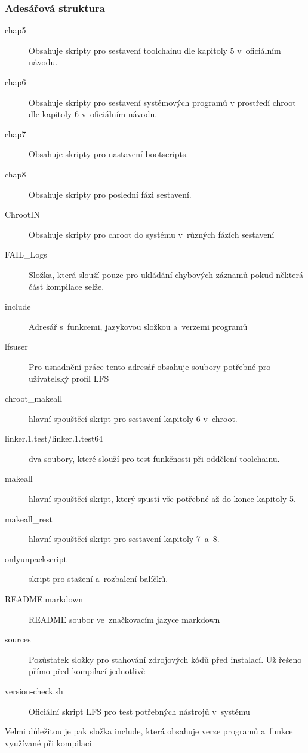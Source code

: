 \documentclass[a4paper,12pt]{article}
\begin{document}
\subsubsection{Adesářová struktura}
\begin{description}
 \item[chap5] Obsahuje skripty pro sestavení toolchainu dle kapitoly 5 v~oficiálním návodu.
 \item[chap6] Obsahuje skripty pro sestavení systémových programů v prostředí chroot dle kapitoly 6 v~oficiálním návodu.
 \item[chap7] Obsahuje skripty pro nastavení bootscripts.
 \item[chap8] Obsahuje skripty pro poslední fázi sestavení.
 \item[ChrootIN] Obsahuje skripty pro chroot do systému v~různých fázích sestavení
 \item[FAIL\_Logs] Složka, která slouží pouze pro ukládání chybových záznamů pokud některá část kompilace selže.
 \item[include] Adresář s~funkcemi, jazykovou složkou a~verzemi programů
 \item[lfsuser] Pro usnadnění práce tento adresář obsahuje soubory potřebné pro uživatelský profil LFS
 \item[chroot\_makeall] hlavní spouštěcí skript pro sestavení kapitoly 6 v~chroot.
 \item[linker.1.test/linker.1.test64] dva soubory, které slouží pro test funkčnosti při oddělení toolchainu.
 \item[makeall] hlavní spouštěcí skript, který spustí vše potřebné až do konce kapitoly 5.
 \item[makeall\_rest] hlavní spouštěcí skript pro sestavení kapitoly 7~a~8.
 \item[onlyunpackscript] skript pro stažení a~rozbalení balíčků.
 \item[README.markdown] README soubor ve~značkovacím jazyce markdown
 \item[sources] Pozůstatek složky pro stahování zdrojových kódů před instalací. Už řešeno přímo před kompilací jednotlivě
 \item[version-check.sh] Oficiální skript LFS pro test potřebných nástrojů v~systému
 \end{description}

Velmi důležitou je pak složka include, která obsahuje verze programů a~funkce využívané při kompilaci
\end{document}
